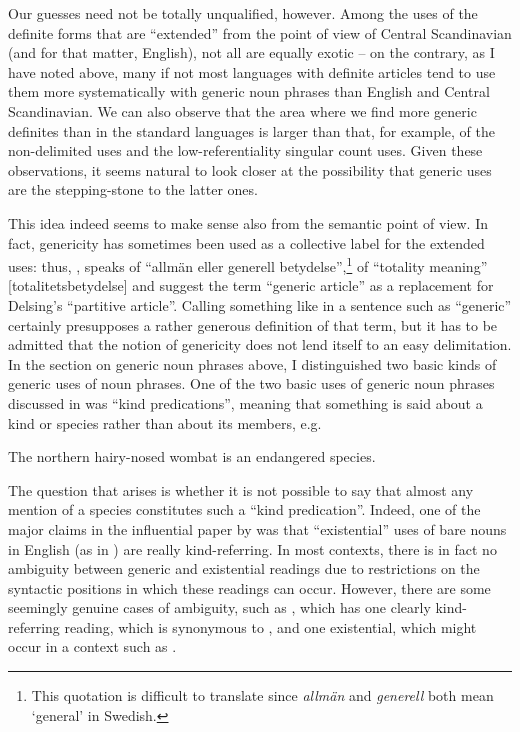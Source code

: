 Our guesses need not be totally unqualified, however. Among the uses of the definite forms that are “extended” from the point of view of Central Scandinavian (and for that matter, English), not all are equally exotic – on the contrary, as I have noted above, many if not most languages with definite articles tend to use them more systematically with generic noun phrases than English and Central Scandinavian. We can also observe that the area where we find more generic definites than in the standard languages is larger than that, for example, of the non-delimited uses and the low-referentiality singular count uses. Given these observations, it seems natural to look closer at the possibility that generic uses are the stepping-stone to the latter ones. 

This idea indeed seems to make sense also from the semantic point of view. In fact, genericity has sometimes been used as a collective label for the extended uses: thus, \citet[134]{Hummelstedt1934}, speaks of “allmän eller generell betydelse”,\footnote{ This quotation is difficult to translate since \textit{allmän} and \textit{generell} both mean ‘general’ in Swedish.} \citet[29]{Marklund1976} of “totality meaning” [totalitetsbetydelse] and \citet{BergholmEtAl1999} suggest the term “generic article” as a replacement for Delsing’s “partitive article”. Calling something like  in a sentence such as  “generic” certainly presupposes a rather generous definition of that term, but it has to be admitted that the notion of genericity does not lend itself to an easy delimitation. In the section on generic noun phrases above, I distinguished two basic kinds of generic uses of noun phrases. One of the two basic uses of generic noun phrases discussed in  was “kind predications”, meaning that something is said about a kind or species rather than about its members, e.g. 

\ea
\gl The northern hairy-nosed wombat is an endangered species. 
\z 

The question that arises is whether it is not possible to say that almost any mention of a species constitutes such a “kind predication”. Indeed, one of the major claims in the influential paper by \citet{Carlson1977} was that “existential” uses of bare nouns in English (as in ) are really kind-referring. In most contexts, there is in fact no ambiguity between generic and existential readings due to restrictions on the syntactic positions in which these readings can occur. However, there are some seemingly genuine cases of ambiguity, such as , which has one clearly kind-referring reading, which is synonymous to , and one existential, which might occur in a context such as .

